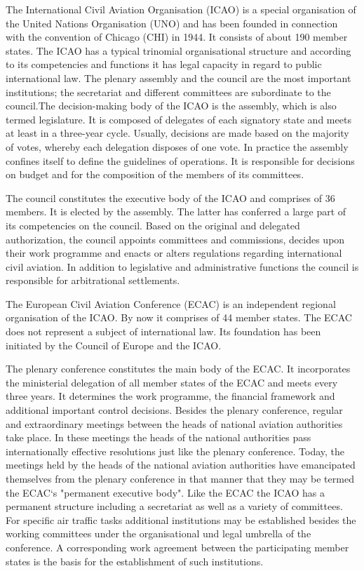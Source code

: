 \documentclass[a4paper, 10pt]{article}
\begin{document}
The International Civil Aviation Organisation (ICAO) is a special organisation of the United
Nations Organisation (UNO) and has been founded in connection with the convention of Chicago (CHI)
in 1944. It consists of about 190 member states. The ICAO has a typical trinomial organisational structure and according to
its competencies and functions it has legal capacity in regard to public international law. The
plenary assembly and the council are the most important institutions; the secretariat and different
committees are subordinate to the council.The decision-making body of the ICAO is the assembly, 
which is also termed legislature. It is composed of delegates of each signatory state and meets at least in a
three-year cycle. Usually, decisions are made based on the majority of votes, whereby each
delegation disposes of one vote. In practice the assembly confines itself to define the guidelines
of operations. It is responsible for decisions on budget and for the composition of the
members of its committees.\par

The council constitutes the executive body of the ICAO and comprises of 36 members. It is
elected by the assembly. The latter has conferred a large part of its competencies on the council.
Based on the original and delegated authorization, the council appoints committees and
commissions, decides upon their work programme and enacts or alters regulations regarding
international civil aviation. In addition to legislative and administrative functions the council
is responsible for arbitrational settlements.\par

The European Civil Aviation Conference (ECAC) is an independent regional organisation of
the ICAO. By now it comprises of 44 member states. The ECAC does not represent a subject
of international law. Its foundation has been initiated by the Council of Europe and the ICAO.\par

The plenary conference constitutes the main body of the ECAC. It incorporates the ministerial
delegation of all member states of the ECAC and meets every three years. It determines the
work programme, the financial framework and additional important control decisions. 
Besides the plenary conference, regular and extraordinary meetings between
the heads of national aviation authorities take place. In these meetings the
heads of the national authorities pass internationally effective resolutions just like the plenary
conference. Today, the meetings held by the heads of the national aviation authorities have
emancipated themselves from the plenary conference in that manner that they may be termed
the ECAC`s "permanent executive body". Like the ECAC the ICAO has a
permanent structure including a secretariat as well as a variety of committees. For specific air
traffic tasks additional institutions may be established besides the working committees under
the organisational und legal umbrella of the conference. A corresponding work agreement between
the participating member states is the basis for the establishment of such institutions.\par
\end{document}
